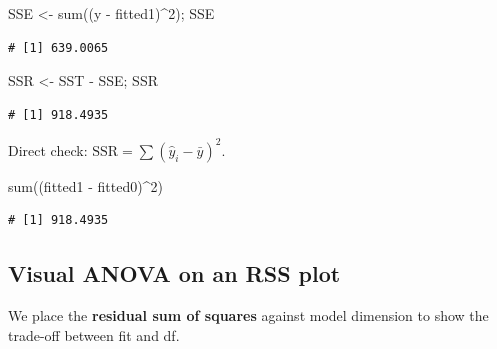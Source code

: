 \documentclass[
  letterpaper,
  DIV=11,
  numbers=noendperiod]{scrreprt}
\newenvironment{Shaded}{\begin{snugshade}}{\end{snugshade}}
\newcommand{\DecValTok}[1]{\textcolor[rgb]{0.68,0.00,0.00}{#1}}
\newcommand{\FunctionTok}[1]{\textcolor[rgb]{0.28,0.35,0.67}{#1}}
\newcommand{\NormalTok}[1]{\textcolor[rgb]{0.00,0.23,0.31}{#1}}
\newcommand{\OtherTok}[1]{\textcolor[rgb]{0.00,0.23,0.31}{#1}}
\newcommand{\SpecialCharTok}[1]{\textcolor[rgb]{0.37,0.37,0.37}{#1}}
\begin{document}
\begin{Shaded}
\begin{Highlighting}[]
\NormalTok{SSE }\OtherTok{\textless{}{-}} \FunctionTok{sum}\NormalTok{((y }\SpecialCharTok{{-}}\NormalTok{ fitted1)}\SpecialCharTok{\^{}}\DecValTok{2}\NormalTok{); SSE}
\end{Highlighting}
\end{Shaded}

\begin{verbatim}
# [1] 639.0065
\end{verbatim}

\begin{Shaded}
\begin{Highlighting}[]
\NormalTok{SSR }\OtherTok{\textless{}{-}}\NormalTok{ SST }\SpecialCharTok{{-}}\NormalTok{ SSE; SSR}
\end{Highlighting}
\end{Shaded}

\begin{verbatim}
# [1] 918.4935
\end{verbatim}

Direct check: \(\text{SSR}=\sum(\hat y_i-\bar y)^2\).

\begin{Shaded}
\begin{Highlighting}[]
\FunctionTok{sum}\NormalTok{((fitted1 }\SpecialCharTok{{-}}\NormalTok{ fitted0)}\SpecialCharTok{\^{}}\DecValTok{2}\NormalTok{)}
\end{Highlighting}
\end{Shaded}

\begin{verbatim}
# [1] 918.4935
\end{verbatim}

\subsection{Visual ANOVA on an RSS
plot}\label{visual-anova-on-an-rss-plot}

We place the \textbf{residual sum of squares} against model dimension to
show the trade-off between fit and df.
\end{document}
